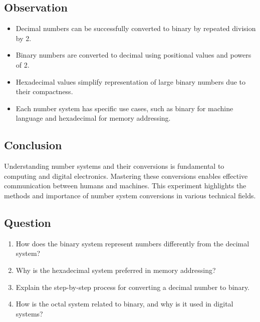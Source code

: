 \documentclass[a4paper,9pt]{article}
\begin{document}
\subsection{Observation}
\begin{itemize}
	\item Decimal numbers can be successfully converted to binary by repeated division by 2.
	
	
	\item Binary numbers are converted to decimal using positional values and powers of 2.
	\item Hexadecimal values simplify representation of large binary numbers due to their compactness.
	\item Each number system has specific use cases, such as binary for machine language and hexadecimal for memory addressing.
\end{itemize}
\subsection{Conclusion}
Understanding number systems and their conversions is fundamental to computing and digital electronics. Mastering these conversions enables effective communication between humans and machines. This experiment highlights the methods and importance of number system conversions in various technical fields.

\subsection{Question}

\begin{enumerate}
	\item How does the binary system represent numbers differently from the decimal system?
	
	\item Why is the hexadecimal system preferred in memory addressing?
	\item Explain the step-by-step process for converting a decimal number to binary.
	\item How is the octal system related to binary, and why is it used in digital systems?
	
\end{enumerate}

\newpage


\end{document}
